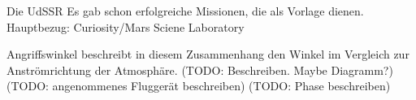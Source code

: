 Die UdSSR 
Es gab schon erfolgreiche Missionen, die als Vorlage dienen. Hauptbezug: Curiosity/Mars Sciene Laboratory

 Angriffswinkel beschreibt in diesem Zusammenhang den Winkel im Vergleich zur Anströmrichtung der Atmosphäre. (TODO: Beschreiben. Maybe Diagramm?)
 (TODO: angenommenes Fluggerät beschreiben)
 (TODO: Phase beschreiben)